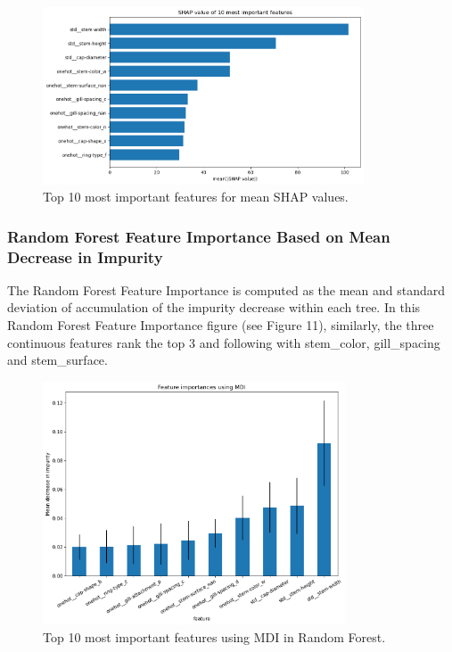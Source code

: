 \documentclass{article}
\begin{document}
\begin{figure}[h]
\centering
\includegraphics[width=0.85\textwidth]{shap_knn.png}
\caption{\label{fig:frog} Top 10 most important features for mean SHAP values.}
\end{figure}

\subsubsection{Random Forest Feature Importance Based on Mean Decrease in Impurity}
\hspace{0.5cm} The Random Forest Feature Importance is computed as the mean and standard deviation of accumulation of the impurity decrease within each tree. In this Random Forest Feature Importance figure (see Figure 11), similarly, the three continuous features rank the top 3 and following with stem\_color, gill\_spacing and stem\_surface. 

\begin{figure}[h]
\centering
\includegraphics[width=0.8\textwidth]{rf_feature_importance.png}
\caption{\label{fig:frog} Top 10 most important features using MDI in Random Forest.}
\end{figure}
\end{document}
